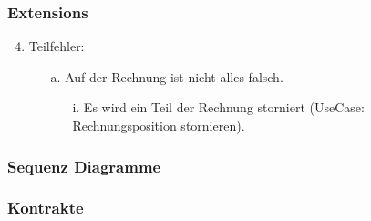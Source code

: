 \documentclass[./detailed_overview_usecases.tex]{subfiles}
\begin{document}
    \subsubsection*{Extensions}
    \begin{enumerate}
        \setcounter{enumi}{3}
        \item Teilfehler:
        \begin{itemize}
            \item[a.] Auf der Rechnung ist nicht alles falsch.
            \begin{itemize}
                \item[i.] Es wird ein Teil der Rechnung storniert (UseCase: Rechnungsposition stornieren).
            \end{itemize}
        \end{itemize}
    \end{enumerate}
    \subsubsection{Sequenz Diagramme}
    \subsubsection{Kontrakte}
\end{document}
